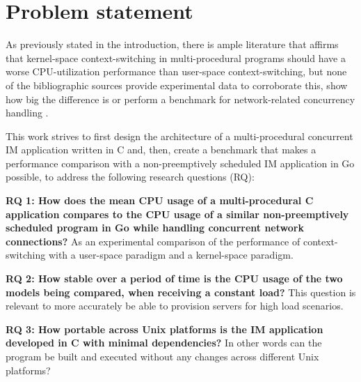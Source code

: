 \section{Problem statement}
As previously stated in the introduction, there is ample literature that affirms that kernel-space context-switching in multi-procedural programs should have a worse CPU-utilization performance than user-space context-switching, but none of the bibliographic sources provide experimental data to corroborate this, show how big the difference is or perform a benchmark for network-related concurrency handling \cite{2003Events}\cite{2005Threads}\cite{2013ContextSwitching}\cite{Cox-Buday2017}\cite{Kerrisk2010}.

This work strives to first design the architecture of a multi-procedural concurrent IM application written in C and, then, create a benchmark that makes a performance comparison with a non-preemptively scheduled IM application in Go possible, to address the following research questions (RQ):

\textbf{RQ 1: How does the mean CPU usage of a multi-procedural C application compares to the CPU usage of a similar non-preemptively scheduled program in Go while handling concurrent network connections?} As an experimental comparison of the performance of context-switching with a user-space paradigm and a kernel-space paradigm. 

\textbf{RQ 2: How stable over a period of time is the CPU usage of the two models being compared, when receiving a constant load?} This question is relevant to more accurately be able to provision servers for high load scenarios.

\textbf{RQ 3: How portable across Unix platforms is the IM application developed in C with minimal dependencies?} In other words can the program be built and executed without any changes across different Unix platforms?




